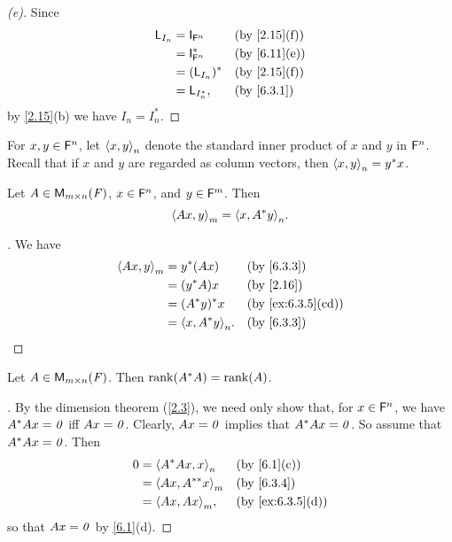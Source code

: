 \begin{proof}[(e)]
	Since
	\begin{align*}
		\L_{I_n} & = \IT[\vs{F}^n]   &  & \by{2.15}[f] \\
		         & = \IT[\vs{F}^n]^* &  & \by{6.11}[e] \\
		         & = (\L_{I_n})^*    &  & \by{2.15}[f] \\
		         & = \L_{I_n^*},     &  & \by{6.3.1}
	\end{align*}
	by \cref{2.15}(b) we have \(I_n = I_n^*\).
\end{proof}

\begin{defn}\label{6.3.3}
	For \(x, y \in \mathsf{F}^n\), let \(\left\langle x, y\right\rangle_n\) denote the standard inner product of \(x\) and \(y\) in \(\mathsf{F}^n\).
	Recall that if \(x\) and \(y\) are regarded as column vectors, then \(\left\langle x, y\right\rangle_n = y^* x\).
\end{defn}

\begin{lem}\label{6.3.4}
	Let \(A \in \ms\), \(x \in \mathsf{F}^n\), and \(y \in \mathsf{F}^m\).
	Then
	\[
		\inn{Ax, y}_m = \inn{x, A^* y}_n.
	\]
\end{lem}

\begin{proof}[]
	We have
	\begin{align*}
		\inn{Ax, y}_m & = y^* (Ax)          &  & \by{6.3.3}        \\
		              & = (y^* A) x         &  & \by{2.16}         \\
		              & = (A^* y)^* x       &  & \by{ex:6.3.5}[cd] \\
		              & = \inn{x, A^* y}_n. &  & \by{6.3.3}
	\end{align*}
\end{proof}

\begin{lem}\label{6.3.5}
	Let \(A \in \ms\).
	Then \(\rk{A^* A} = \rk{A}\).
\end{lem}

\begin{proof}[]
	By the dimension theorem (\cref{2.3}), we need only show that, for \(x \in \mathsf{F}^n\), we have \(A^* Ax = \mathit{0}\) iff \(Ax = \mathit{0}\).
	Clearly, \(Ax = \mathit{0}\) implies that \(A^* Ax = \mathit{0}\).
	So assume that \(A^* Ax = \mathit{0}\).
	Then
	\begin{align*}
		0 & = \inn{A^* Ax, x}_n    &  & \by{6.1}[c]      \\
		  & = \inn{Ax, A^{**} x}_m &  & \by{6.3.4}       \\
		  & = \inn{Ax, Ax}_m,      &  & \by{ex:6.3.5}[d]
	\end{align*}
	so that \(Ax = \mathit{0}\) by \cref{6.1}(d).
\end{proof}


